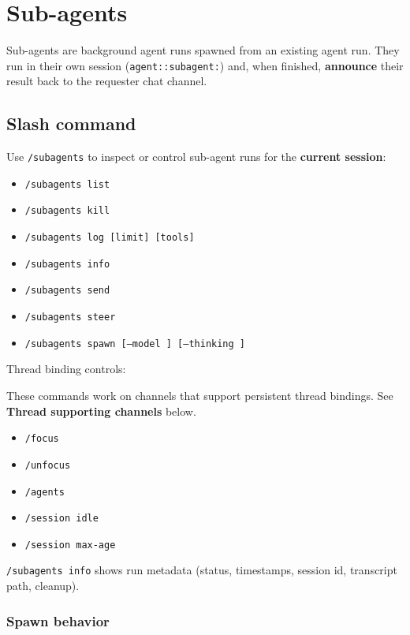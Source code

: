 \clearpage

\section{Sub-agents}


Sub-agents are background agent runs spawned from an existing agent run. They run in their own session (\texttt{agent::subagent:}) and, when finished, \textbf{announce} their result back to the requester chat channel.

\subsection{Slash command}


Use \texttt{/subagents} to inspect or control sub-agent runs for the \textbf{current session}:

\begin{itemize}
  \item \texttt{/subagents list}
  \item \texttt{/subagents kill }
  \item \texttt{/subagents log  [limit] [tools]}
  \item \texttt{/subagents info }
  \item \texttt{/subagents send  }
  \item \texttt{/subagents steer  }
  \item \texttt{/subagents spawn   [--model ] [--thinking ]}
\end{itemize}


Thread binding controls:

These commands work on channels that support persistent thread bindings. See \textbf{Thread supporting channels} below.

\begin{itemize}
  \item \texttt{/focus }
  \item \texttt{/unfocus}
  \item \texttt{/agents}
  \item \texttt{/session idle }
  \item \texttt{/session max-age }
\end{itemize}


\texttt{/subagents info} shows run metadata (status, timestamps, session id, transcript path, cleanup).

\subsubsection{Spawn behavior}


